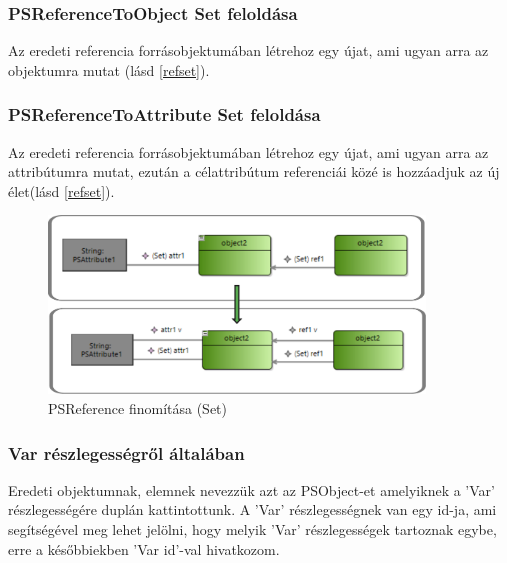 \subsubsection{PSReferenceToObject Set feloldása}
Az eredeti referencia forrásobjektumában létrehoz egy újat, ami ugyan arra az objektumra mutat (lásd \autoref{refset}).

\subsubsection{PSReferenceToAttribute Set feloldása}
Az eredeti referencia forrásobjektumában létrehoz egy újat, ami ugyan arra az attribútumra mutat, ezután a célattribútum referenciái közé is hozzáadjuk az új élet(lásd \autoref{refset}).
\begin{figure}[!ht]
	\centering
	\includegraphics[width=100mm]{figures/refset.pdf}
	\caption{PSReference finomítása (Set)}
	\label{refset} 
\end{figure}

\subsubsection{Var részlegességről általában}
Eredeti objektumnak, elemnek nevezzük azt az PSObject-et amelyiknek a 'Var' részlegességére duplán kattintottunk. A 'Var' részlegességnek van egy id-ja, ami segítségével meg lehet jelölni, hogy melyik 'Var' részlegességek tartoznak egybe, erre a későbbiekben 'Var id'-val hivatkozom.


